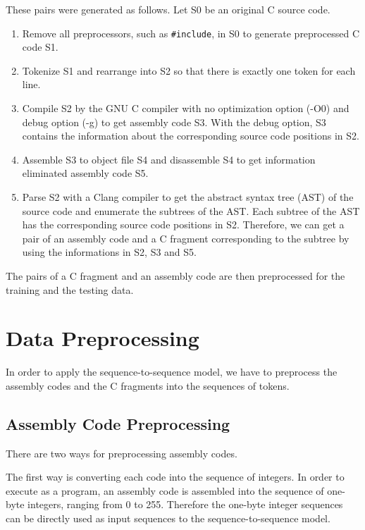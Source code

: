 \documentclass[senior,final,11pt]{iscs-thesis}
\begin{document}
These pairs were generated as follows. Let S0 be an original C source code.
\begin{enumerate}
\item Remove all preprocessors, such as \texttt{\#include}, in S0 to generate preprocessed C code S1. 
\item Tokenize S1 and rearrange into S2 so that there is exactly one token for each line. 
\item 
Compile S2 by the GNU C compiler with no optimization option (-O0) and debug option (-g) to get assembly code S3. 
With the debug option, S3 contains the information about the corresponding source code positions in S2. 
\item Assemble S3 to object file S4 and disassemble S4 to get information eliminated assembly code S5.
\item 
Parse S2 with a Clang compiler to get the abstract syntax tree (AST) of the source code and enumerate the subtrees of the AST.
Each subtree of the AST has the corresponding source code positions in S2.
Therefore, we can get a pair of an assembly code and a C fragment corresponding to the subtree 
by using the informations in S2, S3 and S5.
\end{enumerate}

The pairs of a C fragment and an assembly code are then preprocessed for the training and the testing data.

\section{Data Preprocessing}

In order to apply the sequence-to-sequence model, 
we have to preprocess the assembly codes and the C fragments into the sequences of tokens.

\subsection{Assembly Code Preprocessing}
There are two ways for preprocessing assembly codes.

The first way is converting each code into the sequence of integers. 
In order to execute as a program, an assembly code is assembled into the sequence of one-byte integers, ranging from 0 to 255.
Therefore the one-byte integer sequences can be directly used as input sequences to the sequence-to-sequence model.
\end{document}
